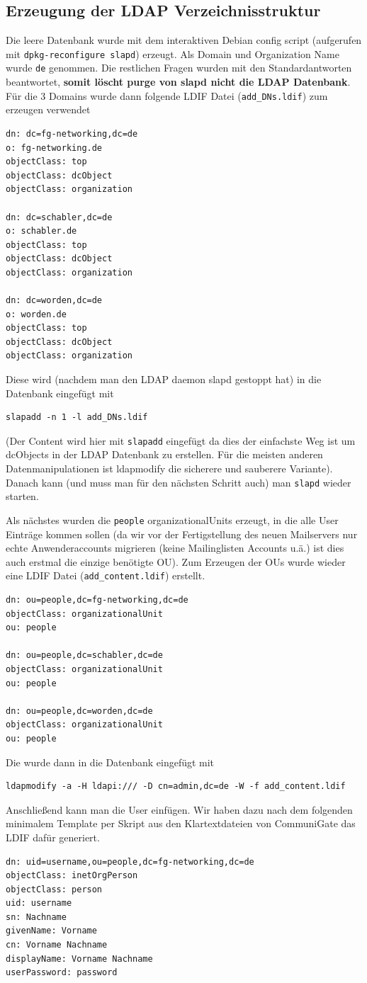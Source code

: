 \documentclass[11pt,a4paper,titlepage=firstiscover,headsepline,bibtotoc]{scrartcl} %
\begin{document}
\subsection{Erzeugung der LDAP Verzeichnisstruktur}
Die leere Datenbank wurde mit dem interaktiven Debian config script (aufgerufen mit \texttt{dpkg-reconfigure slapd}) erzeugt. Als Domain und Organization Name wurde \texttt{de} genommen. Die restlichen Fragen wurden mit den Standardantworten beantwortet, \textbf{somit löscht purge von slapd nicht die LDAP Datenbank}. Für die 3 Domains wurde dann folgende LDIF Datei (\texttt{add\_DNs.ldif}) zum erzeugen verwendet
\begin{lstlisting}
dn: dc=fg-networking,dc=de
o: fg-networking.de
objectClass: top
objectClass: dcObject
objectClass: organization

dn: dc=schabler,dc=de
o: schabler.de
objectClass: top
objectClass: dcObject
objectClass: organization

dn: dc=worden,dc=de
o: worden.de
objectClass: top
objectClass: dcObject
objectClass: organization

\end{lstlisting}
Diese wird (nachdem man den LDAP daemon slapd gestoppt hat) in die Datenbank eingefügt mit
\begin{lstlisting}
slapadd -n 1 -l add_DNs.ldif
\end{lstlisting}
(Der Content wird hier mit \texttt{slapadd} eingefügt da dies der einfachste Weg ist um dcObjects in der LDAP Datenbank zu erstellen. Für die meisten anderen Datenmanipulationen ist ldapmodify die sicherere und sauberere Variante). Danach kann (und muss man für den nächsten Schritt auch) man \texttt{slapd} wieder starten.

Als nächstes wurden die \texttt{people} organizationalUnits erzeugt, in die alle User Einträge kommen sollen (da wir vor der Fertigstellung des neuen Mailservers nur echte Anwenderaccounts migrieren (keine Mailinglisten Accounts u.ä.) ist dies auch erstmal die einzige benötigte OU). Zum Erzeugen der OUs wurde wieder eine LDIF Datei (\texttt{add\_content.ldif}) erstellt.
\begin{lstlisting}
dn: ou=people,dc=fg-networking,dc=de
objectClass: organizationalUnit
ou: people

dn: ou=people,dc=schabler,dc=de
objectClass: organizationalUnit
ou: people

dn: ou=people,dc=worden,dc=de
objectClass: organizationalUnit
ou: people
\end{lstlisting}
Die wurde dann in die Datenbank eingefügt mit
\begin{lstlisting}
ldapmodify -a -H ldapi:/// -D cn=admin,dc=de -W -f add_content.ldif
\end{lstlisting}
Anschließend kann man die User einfügen. Wir haben dazu nach dem folgenden minimalem Template per Skript aus den Klartextdateien von CommuniGate das LDIF dafür generiert.
\begin{lstlisting}
dn: uid=username,ou=people,dc=fg-networking,dc=de
objectClass: inetOrgPerson
objectClass: person
uid: username
sn: Nachname
givenName: Vorname
cn: Vorname Nachname
displayName: Vorname Nachname
userPassword: password
\end{lstlisting}
\end{document}
